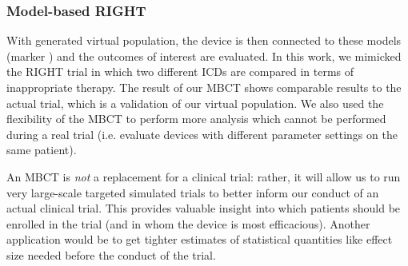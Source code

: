 \documentclass[a4paper,11pt]{article}
\newcommand*\circled[1]{\tikz[baseline=(char.base)]{
		\node[shape=circle,draw,inner sep=2pt] (char) {#1};}}
\begin{document}
\subsubsection{Model-based RIGHT}
With generated virtual population, the device is then connected to these models (marker \circled{4}) and the outcomes of interest are evaluated.
In this work, we mimicked the RIGHT trial in which two different ICDs are compared in terms of inappropriate therapy.
The result of our MBCT shows comparable results to the actual trial, which is a validation of our virtual population.
We also used the flexibility of the MBCT to perform more analysis which cannot be performed during a real trial (i.e. evaluate devices with different parameter settings on the same patient).

An MBCT is \emph{not} a replacement for a clinical trial: rather, it will allow us to run very large-scale targeted simulated trials to better inform our conduct of an actual clinical trial.
This provides valuable insight into which patients should be enrolled in the trial (and in whom the device is most efficacious).
Another application would be to get tighter estimates of statistical quantities like effect size needed before the conduct of the trial. 
%
%
%
\end{document}
